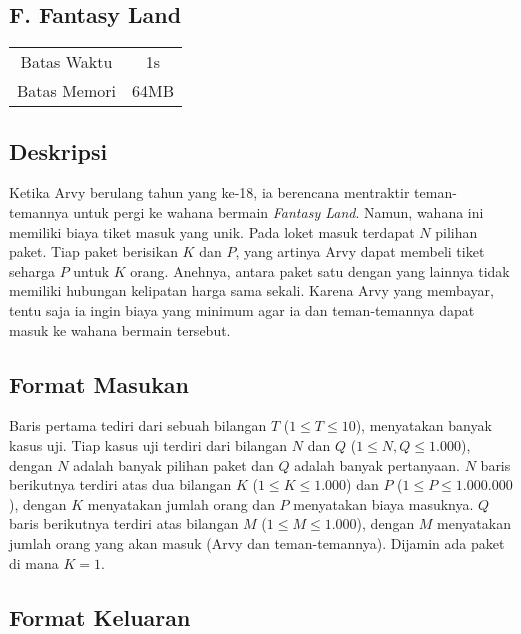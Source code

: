 \documentclass{article}
\begin{document}
\begin{center}
    \section*{F. Fantasy Land} %

    \begin{tabular}{ | c c | }
        \hline
        Batas Waktu  & 1s \\    %
        Batas Memori & 64MB \\  %
        \hline
    \end{tabular}
\end{center}

\subsection*{Deskripsi}

Ketika Arvy berulang tahun yang ke-18, ia berencana mentraktir teman-temannya untuk pergi ke wahana bermain \textit{Fantasy Land}.
Namun, wahana ini memiliki biaya tiket masuk yang unik.
Pada loket masuk terdapat $N$ pilihan paket.
Tiap paket berisikan $K$ dan $P$, yang artinya Arvy dapat membeli tiket seharga $P$ untuk $K$ orang.
Anehnya, antara paket satu dengan yang lainnya tidak memiliki hubungan kelipatan harga sama sekali.
Karena Arvy yang membayar, tentu saja ia ingin biaya yang minimum agar ia dan teman-temannya dapat masuk ke wahana bermain tersebut.


\subsection*{Format Masukan}

Baris pertama tediri dari sebuah bilangan $T$ ($1 \leq T \leq 10$), menyatakan banyak kasus uji.
Tiap kasus uji terdiri dari bilangan $N$ dan $Q$ ($1 \leq N, Q \leq 1.000$), dengan $N$ adalah banyak pilihan paket dan $Q$ adalah banyak pertanyaan.
$N$ baris berikutnya terdiri atas dua bilangan $K$ ($1 \leq K \leq 1.000$) dan $P$ ($1 \leq P \leq 1.000.000$), dengan $K$ menyatakan jumlah orang dan $P$ menyatakan biaya masuknya.
$Q$ baris berikutnya terdiri atas bilangan $M$ ($1 \leq M \leq 1.000$), dengan $M$ menyatakan jumlah orang yang akan masuk (Arvy dan teman-temannya).
Dijamin ada paket di mana $K = 1$.

\subsection*{Format Keluaran}
\end{document}
